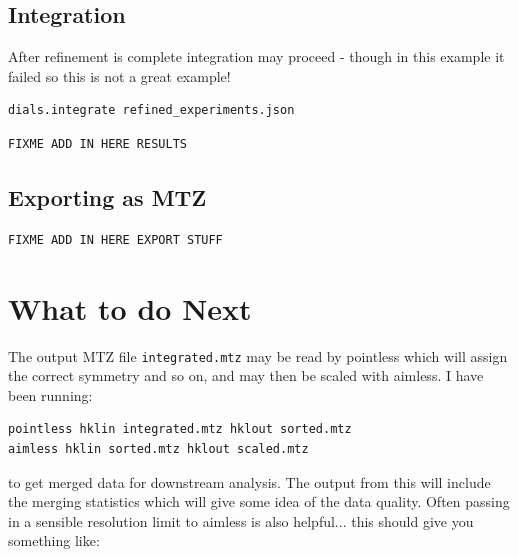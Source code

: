 \documentclass[a4paper, 11pt]{article}
\begin{document}
\subsection{Integration}

After refinement is complete integration may proceed - though in this
example it failed so this is not a great example!

{\small
\begin{verbatim}
dials.integrate refined_experiments.json 
\end{verbatim}
}

{\small
\begin{verbatim}
FIXME ADD IN HERE RESULTS
\end{verbatim}
}

\subsection{Exporting as MTZ}

{\small
\begin{verbatim}
FIXME ADD IN HERE EXPORT STUFF
\end{verbatim}
}

\section{What to do Next}

The output MTZ file \verb|integrated.mtz| may be read by pointless which will assign the correct symmetry and so on, and may then be scaled with aimless. I have been running:

{\small
\begin{verbatim}
pointless hklin integrated.mtz hklout sorted.mtz
aimless hklin sorted.mtz hklout scaled.mtz
\end{verbatim}
}

\noindent
to get merged data for downstream analysis. The output from this will
include the merging statistics which will give some idea of the data
quality. Often passing in a sensible resolution limit to aimless is
also helpful... this should give you something like:
\end{document}
